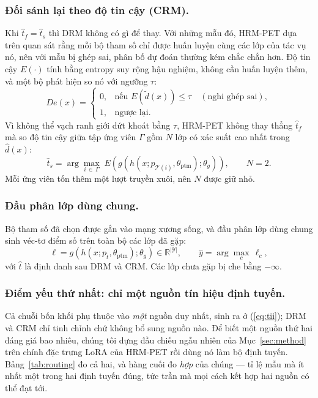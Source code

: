 \documentclass[runningheads]{llncs}
\begin{document}
\subsubsection{Đối sánh lại theo độ tin cậy (CRM).}
Khi $\hat{t}_f = \hat{t}_s$ thì DRM không có gì để thay. Với những mẫu đó, HRM-PET
dựa trên quan sát rằng mỗi bộ tham số chỉ được huấn luyện cùng các lớp của tác vụ
nó, nên với mẫu bị ghép sai, phân bố dự đoán thường kém chắc chắn hơn. Độ tin cậy
$E(\cdot)$ tính bằng entropy suy rộng hậu nghiệm, không cần huấn luyện thêm, và
một bộ phát hiện so nó với ngưỡng $\tau$:
\begin{equation}
De(x) =
\begin{cases}
0, & \text{nếu } E(\tilde{d}(x)) \leq \tau \quad (\text{nghi ghép sai}),\\
1, & \text{ngược lại.}
\end{cases}
\label{eq:detect}
\end{equation}
Vì không thể vạch ranh giới dứt khoát bằng $\tau$, HRM-PET không thay thẳng
$\hat{t}_f$ mà so độ tin cậy giữa tập ứng viên $\Gamma$ gồm $N$ lớp có xác suất
cao nhất trong $\hat{d}(x)$:
\begin{equation}
\hat{t}_s = \arg\max_{i \,\in\, \Gamma}\;
   E\!\left(g\!\left(h(x; p_{\mathcal{T}(i)}, \theta_{\mathrm{ptm}});
   \theta_g\right)\right),
\qquad N = 2 .
\label{eq:crm}
\end{equation}
Mỗi ứng viên tốn thêm một lượt truyền xuôi, nên $N$ được giữ nhỏ.

\subsubsection{Đầu phân lớp dùng chung.}
Bộ tham số đã chọn được gắn vào mạng xương sống, và đầu phân lớp dùng chung sinh
véc-tơ điểm số trên toàn bộ các lớp đã gặp:
\begin{equation}
\ell = g\!\left(h(x; p_{\hat{t}}, \theta_{\mathrm{ptm}}); \theta_g\right)
   \in \mathbb{R}^{|\mathcal{Y}|},
\qquad
\hat{y} = \arg\max_c\, \ell_c ,
\label{eq:logits}
\end{equation}
với $\hat{t}$ là định danh sau DRM và CRM. Các lớp chưa gặp bị che bằng $-\infty$.

\subsubsection{Điểm yếu thứ nhất: chỉ một nguồn tín hiệu định tuyến.}
Cả chuỗi bốn khối phụ thuộc vào \emph{một} nguồn duy nhất, sinh ra ở
(\ref{eq:tii}); DRM và CRM chỉ tinh chỉnh chứ không bổ sung nguồn nào. Để biết
một nguồn thứ hai đáng giá bao nhiêu, chúng tôi dựng đầu chiếu ngẫu nhiên của
Mục~\ref{sec:method} trên chính đặc trưng LoRA của HRM-PET rồi dùng nó làm bộ
định tuyến. Bảng~\ref{tab:routing} đo cả hai, và hàng cuối đo \emph{hợp} của
chúng --- tỉ lệ mẫu mà ít nhất một trong hai định tuyến đúng, tức trần mà mọi
cách kết hợp hai nguồn có thể đạt tới.
\end{document}
